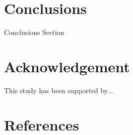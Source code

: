 \documentclass[review, 1p, number, sort&compress,table]{elsarticle}
\begin{document}

	\section{Conclusions}
	\indent Conclusions Section

	\section{Acknowledgement}
	\indent This study has been supported by...      			
	
\section{References}
		
\end{document}
